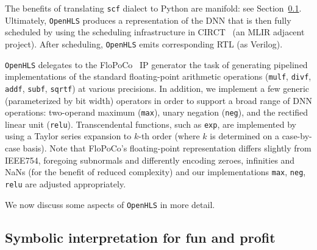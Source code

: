 \documentclass[10pt]{sig-alternate}
\begin{document}
The benefits of translating \texttt{scf} dialect to Python are manifold: see Section~\ref{subsec:Symbolic-execution-for}.
Ultimately, \texttt{OpenHLS} produces a representation of the DNN
that is then fully scheduled by using the scheduling infrastructure in
CIRCT~\cite{oppermann2022eurollvm} (an MLIR adjacent project). After
scheduling, \texttt{OpenHLS} emits corresponding RTL (as Verilog).

\texttt{OpenHLS} delegates to the FloPoCo~\cite{8877424} IP generator
the task of generating pipelined implementations of the standard floating-point
arithmetic operations (\texttt{mulf}, \texttt{divf}, \texttt{addf},
\texttt{subf}, \texttt{sqrtf}) at various precisions. In addition,
we implement a few generic (parameterized by bit width) operators
in order to support a broad range of DNN operations: two-operand maximum
(\texttt{max}), unary negation (\texttt{neg}), and the rectified linear
unit (\texttt{relu}). Transcendental functions, such as \texttt{exp},
are implemented by using a Taylor series expansion to $k$-th order (where
$k$ is determined on a case-by-case basis). Note that FloPoCo's floating-point
representation differs slightly from IEEE754, foregoing subnormals
and differently encoding zeroes, infinities and NaNs (for the benefit
of reduced complexity) and our implementations \texttt{max}, \texttt{neg},
\texttt{relu} are adjusted appropriately.

We now discuss some aspects of \texttt{OpenHLS} in more detail.

\subsection{Symbolic interpretation for fun and profit}\label{subsec:Symbolic-execution-for}
\end{document}
